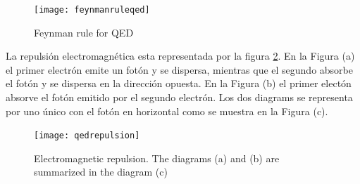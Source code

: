\begin{figure}
  \texttt{[image: feynmanruleqed]} %
  \caption{Feynman rule for QED}
  \label{fig:feynmanruleqed}
\end{figure}

La repulsión electromagnética esta representada por la figura \ref{fig:qedrepulsion}. En la Figura (a) el primer electrón emite un fotón y se dispersa, mientras que el segundo absorbe el fotón y se dispersa en la dirección opuesta. En la Figura (b) el primer electón absorve el fotón emitido por el segundo electrón. Los dos diagrams se representa por uno único con el fotón en horizontal como se muestra en la Figura (c).

\begin{figure}
  \centering
  \texttt{[image: qedrepulsion]}
  \caption{Electromagnetic repulsion. The diagrams (a) and (b) are summarized in the diagram (c)}
  \label{fig:qedrepulsion}
\end{figure}





